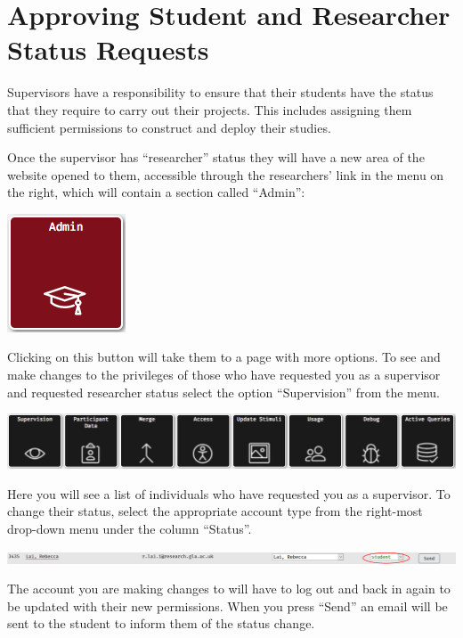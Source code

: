 \documentclass[]{book}
\begin{document}
\section*{Approving Student and Researcher Status
Requests}\label{approving-student-and-researcher-status-requests-1}

Supervisors have a responsibility to ensure that their students have the
status that they require to carry out their projects. This includes
assigning them sufficient permissions to construct and deploy their
studies.

Once the supervisor has ``researcher'' status they will have a new area
of the website opened to them, accessible through the researchers' link
in the menu on the right, which will contain a section called ``Admin'':

\includegraphics{images/screenshots/admin_button.png}

Clicking on this button will take them to a page with more options. To
see and make changes to the privileges of those who have requested you
as a supervisor and requested researcher status select the option
``Supervision'' from the menu.

\includegraphics{images/screenshots/admin_options.png}

Here you will see a list of individuals who have requested you as a
supervisor. To change their status, select the appropriate account type
from the right-most drop-down menu under the column ``Status''.

\includegraphics{images/screenshots/status_bar.png}

The account you are making changes to will have to log out and back in
again to be updated with their new permissions. When you press ``Send''
an email will be sent to the student to inform them of the status
change.
\end{document}
